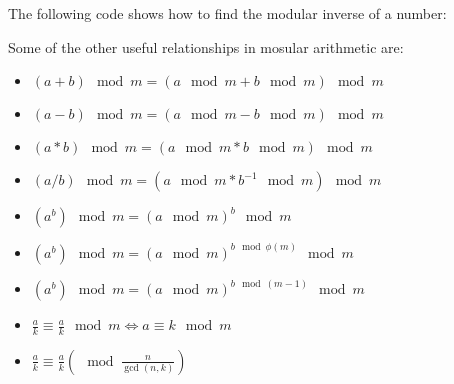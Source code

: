 The following code shows how to find the modular inverse of a number:



Some of the other useful relationships in mosular arithmetic are:

\begin{itemize}
\item $ (a+b) \mod m = (a \mod m + b \mod m) \mod m $
\item $ (a-b) \mod m = (a \mod m - b \mod m) \mod m $
\item $ (a*b) \mod m = (a \mod m * b \mod m) \mod m $
\item $ (a/b) \mod m = (a \mod m * b^{-1} \mod m) \mod m $
\item $ (a^b) \mod m = (a \mod m)^b \mod m $
\item $ (a^b) \mod m = (a \mod m)^{b \mod \phi(m)} \mod m $
\item $ (a^b) \mod m = (a \mod m)^{b \mod (m-1)} \mod m $
\item $ \frac{a}{k} \equiv \frac{a}{k} \mod m \iff a \equiv k \mod m $
\item $ \frac{a}{k} \equiv \frac{a}{k} \left( \mod \frac{n}{\gcd (n,k)}\right)$
\end{itemize}